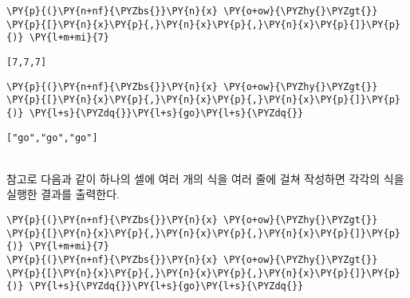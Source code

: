     \begin{tcolorbox}[breakable, size=fbox, boxrule=1pt, pad at break*=1mm,colback=cellbackground, colframe=cellborder, top=.75ex]
\begin{Verbatim}[commandchars=\\\{\}]
\PY{p}{(}\PY{n+nf}{\PYZbs{}}\PY{n}{x} \PY{o+ow}{\PYZhy{}\PYZgt{}} \PY{p}{[}\PY{n}{x}\PY{p}{,}\PY{n}{x}\PY{p}{,}\PY{n}{x}\PY{p}{]}\PY{p}{)} \PY{l+m+mi}{7}
\end{Verbatim}
\end{tcolorbox}

    
    \begin{Verbatim}[commandchars=\\\{\}]
[7,7,7]
    \end{Verbatim}

    
    \begin{tcolorbox}[breakable, size=fbox, boxrule=1pt, pad at break*=1mm,colback=cellbackground, colframe=cellborder, top=.75ex]
\begin{Verbatim}[commandchars=\\\{\}]
\PY{p}{(}\PY{n+nf}{\PYZbs{}}\PY{n}{x} \PY{o+ow}{\PYZhy{}\PYZgt{}} \PY{p}{[}\PY{n}{x}\PY{p}{,}\PY{n}{x}\PY{p}{,}\PY{n}{x}\PY{p}{]}\PY{p}{)} \PY{l+s}{\PYZdq{}}\PY{l+s}{go}\PY{l+s}{\PYZdq{}}
\end{Verbatim}
\end{tcolorbox}

    
    \begin{Verbatim}[commandchars=\\\{\}]
["go","go","go"]
    \end{Verbatim}

    ~\\[-1ex]\noindent
    참고로 다음과 같이 하나의 셀에 여러 개의 식을 여러 줄에 걸쳐 작성하면
각각의 식을 실행한 결과를 출력한다.

    \begin{tcolorbox}[breakable, size=fbox, boxrule=1pt, pad at break*=1mm,colback=cellbackground, colframe=cellborder, top=.75ex]
\begin{Verbatim}[commandchars=\\\{\}]
\PY{p}{(}\PY{n+nf}{\PYZbs{}}\PY{n}{x} \PY{o+ow}{\PYZhy{}\PYZgt{}} \PY{p}{[}\PY{n}{x}\PY{p}{,}\PY{n}{x}\PY{p}{,}\PY{n}{x}\PY{p}{]}\PY{p}{)} \PY{l+m+mi}{7}
\PY{p}{(}\PY{n+nf}{\PYZbs{}}\PY{n}{x} \PY{o+ow}{\PYZhy{}\PYZgt{}} \PY{p}{[}\PY{n}{x}\PY{p}{,}\PY{n}{x}\PY{p}{,}\PY{n}{x}\PY{p}{]}\PY{p}{)} \PY{l+s}{\PYZdq{}}\PY{l+s}{go}\PY{l+s}{\PYZdq{}}
\end{Verbatim}
\end{tcolorbox}

